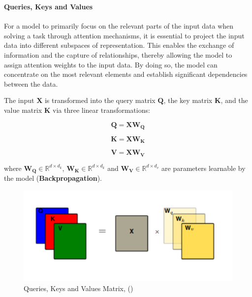 \textbf{Queries, Keys and Values}
\\\\
For a model to primarily focus on the relevant parts of the input data when solving a task through attention mechanisms, it is essential to project the input data into different subspaces of representation. This enables the exchange of information and the capture of relationships, thereby allowing the model to assign attention weights to the input data. By doing so, the model can concentrate on the most relevant elements and establish significant dependencies between the data. 

The input $\mathbf{X}$ is transformed into the query matrix $\mathbf{Q}$, the key matrix $\mathbf{K}$, and the value
matrix $\mathbf{K}$ via three linear transformations:

\begin{equation}
    \mathbf{Q}=\mathbf{X}\mathbf{W_{Q}}
\end{equation}

\begin{equation}
    \mathbf{K}=\mathbf{X}\mathbf{W_{K}}
\end{equation}

\begin{equation}
    \mathbf{V}=\mathbf{X}\mathbf{W_{V}}
\end{equation}

where $\mathbf{W_{Q}} \in \mathbb{R}^{d \times d_{k}}$, $\mathbf{W_{K}} \in \mathbb{R}^{d \times d_{k}}$ and $\mathbf{W_{V}} \in \mathbb{R}^{d \times d_{v}}$ are parameters learnable by the model (\textbf{Backpropagation}).

\begin{figure}[h!]
    \centering%
    \includegraphics[width=\linewidth]{Figures/background/Linear_Transformations (1).png}
    \caption{Queries, Keys and Values Matrix, (\cite{goodfellow2016dive})}
    \label{fig:attention}
\end{figure}


